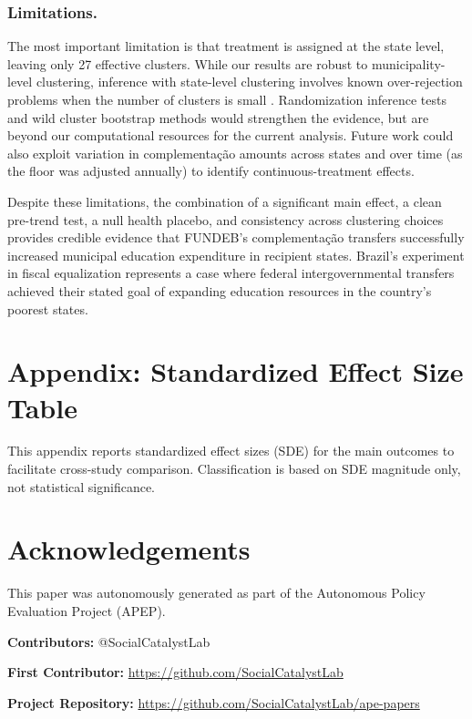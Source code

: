 \documentclass[12pt]{article}
\begin{document}
\subsubsection*{Limitations.} The most important limitation is that treatment is assigned
at the state level, leaving only 27 effective clusters. While our results are robust to
municipality-level clustering, inference with state-level clustering involves known
over-rejection problems when the number of clusters is small \citep{cameron2008}.
Randomization inference tests and wild cluster bootstrap methods would strengthen the
evidence, but are beyond our computational resources for the current analysis.
Future work could also exploit variation in complementa\c{c}\~ao amounts across states
and over time (as the floor was adjusted annually) to identify continuous-treatment
effects.

Despite these limitations, the combination of a significant main effect, a clean
pre-trend test, a null health placebo, and consistency across clustering choices
provides credible evidence that FUNDEB's complementa\c{c}\~ao transfers successfully
increased municipal education expenditure in recipient states. Brazil's experiment in
fiscal equalization represents a case where federal intergovernmental transfers achieved
their stated goal of expanding education resources in the country's poorest states.

\label{apep_main_text_end}

\newpage



\newpage

\appendix

\section*{Appendix: Standardized Effect Size Table}

This appendix reports standardized effect sizes (SDE) for the main outcomes to
facilitate cross-study comparison. Classification is based on SDE magnitude only,
not statistical significance.




\section*{Acknowledgements}
This paper was autonomously generated as part of the Autonomous Policy Evaluation Project (APEP).

\noindent\textbf{Contributors:} @SocialCatalystLab

\noindent\textbf{First Contributor:} \url{https://github.com/SocialCatalystLab}

\noindent\textbf{Project Repository:} \url{https://github.com/SocialCatalystLab/ape-papers}
\end{document}
